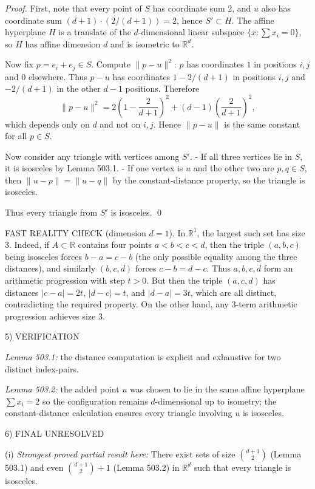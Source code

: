 \emph{Proof.}
First, note that every point of $S$ has coordinate sum $2$, and $u$ also has coordinate sum $(d+1)\cdot (2/(d+1))=2$, hence $S'\subset H$.
The affine hyperplane $H$ is a translate of the $d$-dimensional linear subspace $\{x: \sum x_i=0\}$, so $H$ has affine dimension $d$ and is isometric to $\mathbb R^d$.

Now fix $p=e_i+e_j\in S$.
Compute $\lVert p-u\rVert^2$:
$p$ has coordinates $1$ in positions $i,j$ and $0$ elsewhere.
Thus $p-u$ has coordinates $1-2/(d+1)$ in positions $i,j$ and $-2/(d+1)$ in the other $d-1$ positions.
Therefore
\[
\lVert p-u\rVert^2
=2\left(1-\frac{2}{d+1}\right)^2+(d-1)\left(\frac{2}{d+1}\right)^2,
\]
which depends only on $d$ and not on $i,j$.
Hence $\lVert p-u\rVert$ is the same constant for all $p\in S$.

Now consider any triangle with vertices among $S'$.
- If all three vertices lie in $S$, it is isosceles by Lemma 503.1.
- If one vertex is $u$ and the other two are $p,q\in S$, then $\lVert u-p\rVert=\lVert u-q\rVert$ by the constant-distance property, so the triangle is isosceles.

Thus every triangle from $S'$ is isosceles.
\qed

FAST REALITY CHECK (dimension $d=1$).
In $\mathbb R^1$, the largest such set has size $3$.
Indeed, if $A\subset\mathbb R$ contains four points $a<b<c<d$, then the triple $(a,b,c)$ being isosceles forces $b-a=c-b$ (the only possible equality among the three distances), and similarly $(b,c,d)$ forces $c-b=d-c$. Thus $a,b,c,d$ form an arithmetic progression with step $t>0$.
But then the triple $(a,c,d)$ has distances $\lvert c-a\rvert=2t$, $\lvert d-c\rvert=t$, and $\lvert d-a\rvert=3t$, which are all distinct, contradicting the required property.
On the other hand, any 3-term arithmetic progression achieves size 3.

5) VERIFICATION

\emph{Lemma 503.1:} the distance computation is explicit and exhaustive for two distinct index-pairs.

\emph{Lemma 503.2:} the added point $u$ was chosen to lie in the same affine hyperplane $\sum x_i=2$ so the configuration remains $d$-dimensional up to isometry; the constant-distance calculation ensures every triangle involving $u$ is isosceles.

6) FINAL
UNRESOLVED

(i) \emph{Strongest proved partial result here:} There exist sets of size $\binom{d+1}{2}$ (Lemma 503.1) and even $\binom{d+1}{2}+1$ (Lemma 503.2) in $\mathbb R^d$ such that every triangle is isosceles.

